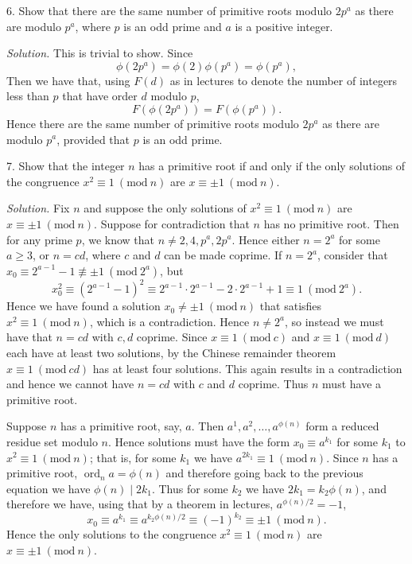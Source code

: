 \documentclass{article}
\newcommand{\Mod}[1]{\ (\mathrm{mod}\ #1)}
\DeclareMathOperator{\ord}{ord}
\begin{document}
\newpage

6. Show that there are the same number of primitive roots modulo $2p^a$
as there are modulo $p^a$, where $p$ is an odd prime and $a$ is a
positive integer.

\textit{Solution.}
This is trivial to show. Since
%
\begin{equation*}
    \phi(2 p^a) = \phi(2) \phi(p^a) = \phi(p^a)
    ,
\end{equation*}
%
Then we have that, using $F(d)$ as in lectures to denote the number of
integers less than $p$ that have order $d$ modulo $p$,
%
\begin{equation*}
    F(\phi(2 p^a)) = F(\phi(p^a))
    .
\end{equation*}
%
Hence there are the same number of primitive roots modulo $2p^a$
as there are modulo $p^a$, provided that $p$ is an odd prime.

\newpage

7. Show that the integer $n$ has a primitive root if and only if the
only solutions of the congruence $x^2 \equiv 1 \Mod{n}$ are
$x \equiv \pm 1 \Mod{n}$.

\textit{Solution.}
Fix $n$ and suppose the only solutions of $x^2 \equiv 1 \Mod{n}$ are
$x \equiv \pm 1 \Mod{n}$. Suppose for contradiction that $n$
has no primitive root. Then for any prime $p$, we know that
$n \neq 2, 4, p^a, 2p^a$. Hence either $n = 2^a$ for some $a \geq 3$, or
$n = c d$, where $c$ and $d$ can be made coprime. If $n = 2^a$, consider
that $x_0 \equiv 2^{a - 1} - 1 \not\equiv \pm 1 \Mod{2^a}$, but
%
\begin{equation*}
    x_0^2
    \equiv (2^{a -1} - 1)^2
    \equiv 2^{a - 1} \cdot 2^{a - 1} - 2 \cdot 2^{a - 1} + 1
    \equiv 1
    \Mod{2^a}
    .
\end{equation*}
%
Hence we have found a solution $x_0 \neq \pm 1 \Mod{n}$ that satisfies
$x^2 \equiv 1 \Mod{n}$, which is a contradiction. Hence $n \neq 2^a$,
so instead we must have that $n = c d$ with $c, d$ coprime. Since
$x \equiv 1 \Mod{c}$ and $x \equiv 1 \Mod{d}$ each have at least two solutions,
by the Chinese remainder theorem $x \equiv 1 \Mod{c d}$ has at least four solutions.
This again results in a contradiction and hence we cannot have $n = c d$ with
$c$ and $d$ coprime. Thus $n$ must have a primitive root.

Suppose $n$ has a primitive root, say, $a$. Then $a^1, a^2, \ldots, a^{\phi(n)}$
form a reduced residue set modulo $n$. Hence solutions must have the form
$x_0 \equiv a^{k_1}$ for some $k_1$ to $x^2 \equiv 1 \Mod{n}$; that is, for some $k_1$
we have $a^{2k_1} \equiv 1 \Mod{n}$. Since $n$ has a primitive root, $\ord_n a = \phi(n)$
and therefore going back to the previous equation we have $\phi(n) \mid 2 k_1$.
Thus for some $k_2$ we have $2 k_1 = k_2 \phi(n)$, and therefore we have,
using that by a theorem in lectures, $a^{\phi(n)/2} = -1$,
%
\begin{equation*}
    x_0 \equiv a^{k_1} \equiv a^{k_2 \phi(n) / 2} \equiv (-1)^{k_2} \equiv \pm 1 \Mod{n}
    .
\end{equation*}
%
Hence the only solutions to the congruence $x^2 \equiv 1 \Mod{n}$ are $x \equiv \pm 1 \Mod{n}$.
\end{document}
